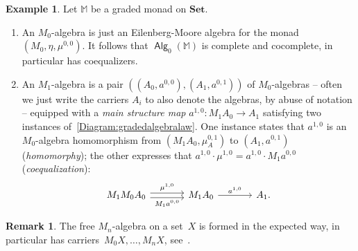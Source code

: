 \documentclass[sigconf,
			final%
			nonacm
                        ]{acmart}
\numberwithin{equation}{section}
\numberwithin{equation}{section}
\theoremstyle{plain}
\theoremstyle{definition}
\newtheorem{expl}[thm]{Example}
\newtheorem{rem}[thm]{Remark}
\newtheorem{notn}[thm]{Notation}
\newcommand{\M}{\mathbb{M}}                   %
\newcommand{\Set}{\mathbf{Set}}
\DeclareMathOperator{\Alg}{\mathsf{Alg}}
\begin{document}
\begin{expl}
Let $\M$ be a graded monad on $\Set$.
\begin{enumerate}
\item An $M_0$-algebra is just an Eilenberg-Moore algebra for the
  monad $(M_0, \eta, \mu^{0,0})$.  It follows that $\Alg_0(\M)$ is
  complete and cocomplete, in particular has coequalizers.


\item An $M_1$-algebra is a pair $((A_0, a^{0,0}), (A_1, a^{0,1}))$ of
  $M_0$-algebras -- often we just write the carriers $A_i$ to also
  denote the algebras, by abuse of notation -- equipped with a
  \emph{main structure map} $a^{1,0}\colon M_1A_0\to A_1$ satisfying
  two instances of~\eqref{Diagram:gradedalgebralaw}.  One instance
  states that $a^{1,0}$ is an $M_0$-algebra homomorphism from
  $(M_1A_0, \mu^{0,1}_A)$ to $(A_1, a^{0,1})$ (\emph{homomorphy}); the
  other expresses that $a^{1,0}\cdot \mu^{1,0}= a^{1,0}\cdot
  M_1a^{0,0}$ (\emph{coequalization}):
  \begin{equation}\label{Diagram:coequalization}
    \begin{tikzcd}[column sep = 35]
      M_1M_0A_0 \arrow[r, "\mu^{1,0}", shift left] \arrow[r,
      "M_1a^{0,0}"', shift right] & M_1A_0 \arrow[r, "a^{1,0}"] & A_1.
    \end{tikzcd}
  \end{equation}
\end{enumerate}
\end{expl}
%
\begin{rem}
  The free $M_n$-algebra on a set~$X$ is formed in the expected way,
  in particular has
  carriers~$M_0X,\dots,M_nX$, see~\cite[Prop.~6.3]{MPS15}.
\end{rem}

\end{document}
